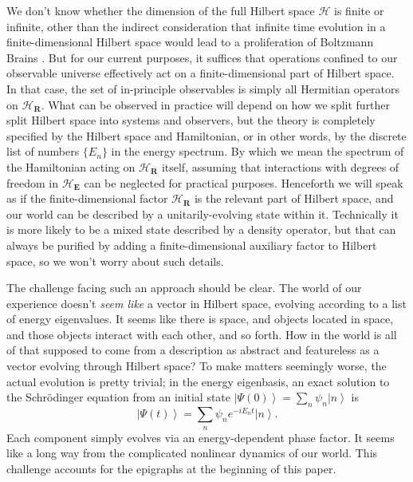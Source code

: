 \documentclass[12pt,english]{article}
\newcommand{\be}{\begin{equation}}
\newcommand{\ee}{\end{equation}}
\newcommand{\HH}{\mathcal{H}}
\newcommand{\ket}[1]{\left| #1 \right\rangle}
\begin{document}
We don't know whether the dimension of the full Hilbert space $\HH$ is finite or infinite, other than the indirect consideration that infinite time evolution in a finite-dimensional Hilbert space would lead to a proliferation of Boltzmann Brains \citep{Dyson2002,Carroll:2008yd}.
But for our current purposes, it suffices that operations confined to our observable universe effectively act on a finite-dimensional part of Hilbert space. 
In that case, the set of in-principle observables is simply all Hermitian operators on $\HH_\mathbf{R}$.
What can be observed in practice will depend on how we split further split Hilbert space into systems and observers, but the theory is completely specified by the Hilbert space and Hamiltonian, or in other words, by the discrete list of numbers $\{E_n\}$ in the energy spectrum.
By which we mean the spectrum of the Hamiltonian acting on $\HH_\mathbf{R}$ itself, assuming that interactions with degrees of freedom in $\HH_\mathbf{E}$ can be neglected for practical purposes.
Henceforth we will speak as if the finite-dimensional factor $\HH_\mathbf{R}$ is the relevant part of Hilbert space, and our world can be described by a unitarily-evolving state within it.
Technically it is more likely to be a mixed state described by a density operator, but that can always be purified by adding a finite-dimensional auxiliary factor to Hilbert space, so we won't worry about such details.

The challenge facing such an approach should be clear.
The world of our experience doesn't \emph{seem like} a vector in Hilbert space, evolving according to a list of energy eigenvalues.
It seems like there is space, and objects located in space, and those objects interact with each other, and so forth.
How in the world is all of that supposed to come from a description as abstract and featureless as a vector evolving through Hilbert space?
To make matters seemingly worse, the actual evolution is pretty trivial; in the energy eigenbasis, an exact solution to the Schr\"odinger equation from an initial state $\ket{\Psi(0)} = \sum_n \psi_n\ket{n}$ is
\be
  \ket{\Psi(t)} = \sum_n \psi_n e^{-i E_n t}\ket{n}.
\ee
Each component simply evolves via an energy-dependent phase factor.
It seems like a long way from the complicated nonlinear dynamics of our world.
This challenge accounts for the epigraphs at the beginning of this paper.
\end{document}
